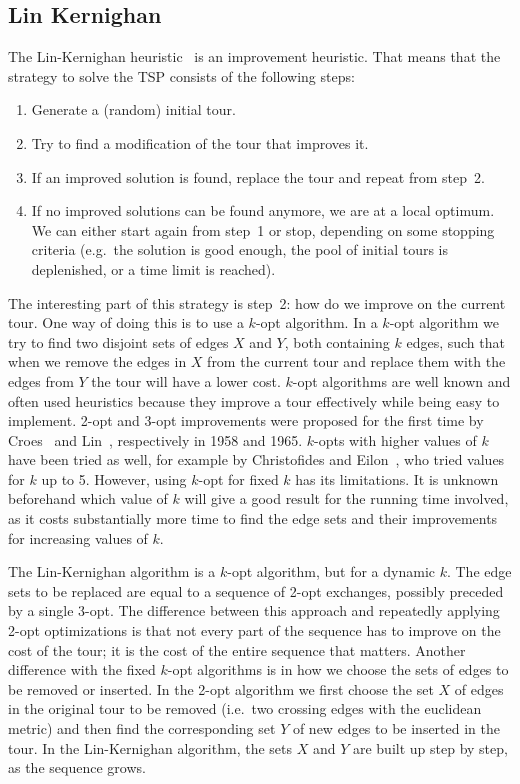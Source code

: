 \documentclass[titlepage, 12pt]{article}
\begin{document}
    \subsection{Lin Kernighan}
    \label{sec:lk}
    The Lin-Kernighan heuristic~\cite{lin-kernighan} is an improvement heuristic. That means that
    the strategy to solve the TSP consists of the following steps:
    \begin{enumerate}
        \item Generate a (random) initial tour.
        \item Try to find a modification of the tour that improves it.
        \item If an improved solution is found, replace the tour and repeat from step~2.
        \item If no improved solutions can be found anymore, we are at a local optimum. We can
            either start again from step~1 or stop, depending on some stopping criteria (e.g.\ the
            solution is good enough, the pool of initial tours is deplenished, or a time limit is
            reached).
    \end{enumerate}

    The interesting part of this strategy is step~2: how do we improve on the current tour. One way
    of doing this is to use a $k$-opt algorithm. In a $k$-opt algorithm we try to find two disjoint
    sets of edges $X$ and $Y$, both containing $k$ edges, such that when we remove the edges in $X$
    from the current tour and replace them with the edges from $Y$ the tour will have a lower cost.
    $k$-opt algorithms are well known and often used heuristics because they improve a tour
    effectively while being easy to implement.
    2-opt and 3-opt improvements were proposed for the first time by Croes~\cite{2-opt} and
    Lin~\cite{3-opt}, respectively in 1958 and 1965. $k$-opts with higher values of $k$ have been
    tried as well, for example by Christofides and Eilon~\cite{2-5-opt}, who tried values for $k$ up
    to 5.
    However, using $k$-opt for fixed $k$ has its limitations. It is unknown beforehand which value
    of $k$ will give a good result for the running time involved, as it costs substantially more
    time to find the edge sets and their improvements for increasing values of $k$.

    The Lin-Kernighan algorithm is a $k$-opt algorithm, but for a dynamic $k$. The edge sets to be
    replaced are equal to a sequence of 2-opt exchanges, possibly preceded by a single 3-opt. The
    difference between this approach and repeatedly applying 2-opt optimizations is that not every
    part of the sequence has to improve on the cost of the tour; it is the cost of the entire
    sequence that matters.
    Another difference with the fixed $k$-opt algorithms is in how we choose the sets of edges to be
    removed or inserted. In the 2-opt algorithm we first choose the set $X$ of edges in the original
    tour to be removed (i.e.\ two crossing edges with the euclidean metric) and then find the
    corresponding set $Y$ of new edges to be inserted in the tour. In the Lin-Kernighan algorithm,
    the sets $X$ and $Y$ are built up step by step, as the sequence grows.
\end{document}
